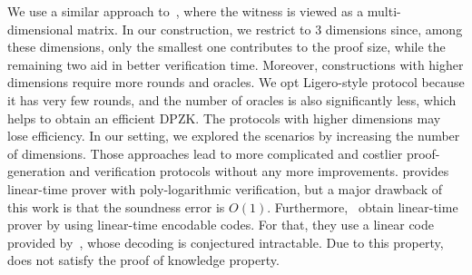 We use a similar approach to~\cite{bootle2020linear, bootle2020zero}, where the witness is viewed as a multi-dimensional matrix. In our construction, we restrict to 3 dimensions since, among these dimensions, only the smallest one contributes to the proof size, while the remaining two aid in better verification time. Moreover, constructions with higher dimensions require more rounds and oracles. We opt Ligero-style protocol because it has very few rounds, and the number of oracles is also significantly less, which helps to obtain an efficient DPZK. The protocols with higher dimensions may lose efficiency.
In our setting, we explored the scenarios by increasing the number of dimensions. Those approaches lead to more complicated and costlier proof-generation and verification protocols without any more improvements. \cite{bootle2020zero} provides linear-time prover with poly-logarithmic verification, but a major drawback of this work is that the soundness error is $O(1)$. Furthermore,~\cite{bootle2020linear} obtain linear-time prover by using linear-time encodable codes. For that, they use a linear code provided by~\cite{druk2014linear}, whose decoding is conjectured intractable. Due to this property, ~\cite{bootle2020linear} does not satisfy the proof of knowledge property.


